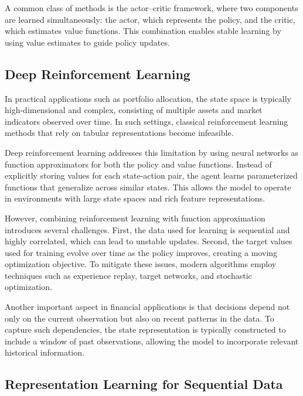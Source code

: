 \documentclass[]{elsarticle}
\begin{document}
A common class of methods is the actor–critic framework, where two components are learned simultaneously: the actor, which represents the policy, and the critic, which estimates value functions. This combination enables stable learning by using value estimates to guide policy updates.

\hypertarget{Deep-Reinforcement-Learning}{%
\subsection{Deep Reinforcement Learning}\label{Deep-Reinforcement-Learning}}

In practical applications such as portfolio allocation, the state space is typically high-dimensional and complex, consisting of multiple assets and market indicators observed over time. In such settings, classical reinforcement learning methods that rely on tabular representations become infeasible. 

Deep reinforcement learning addresses this limitation by using neural networks as function approximators for both the policy and value functions. Instead of explicitly storing values for each state-action pair, the agent learns parameterized functions that generalize across similar states. This allows the model to operate in environments with large state spaces and rich feature representations.

However, combining reinforcement learning with function approximation introduces several challenges. First, the data used for learning is sequential and highly correlated, which can lead to unstable updates. Second, the target values used for training evolve over time as the policy improves, creating a moving optimization objective. To mitigate these issues, modern algorithms employ techniques such as experience replay, target networks, and stochastic optimization.

Another important aspect in financial applications is that decisions depend not only on the current observation but also on recent patterns in the data. To capture such dependencies, the state representation is typically constructed to include a window of past observations, allowing the model to incorporate relevant historical information.

\hypertarget{RL_SD}{%
\subsection{Representation Learning for Sequential Data}\label{RL_SD}}
\end{document}
